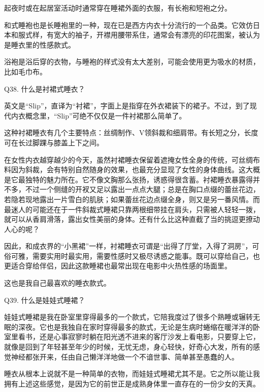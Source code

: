 \documentclass[12pt,UTF8]{ctexbook}
\begin{document}
起夜时或在起居室活动时通常穿在睡裙外面的衣服，有长袍和短袍之分。

和式睡袍也是长睡袍里的一种，现在已是西方内衣十分流行的一个品类。它效仿日本和服式样，有宽大的袖子，开襟用腰带系住，通常会有漂亮的印花图案，被认为是睡衣里的性感款式。

浴袍是浴后穿的衣物，与睡袍的样式没有太大差别，可能会使用更为吸水的材质，比如毛巾布。





Q38. 什么是衬裙式睡衣？


英文是“Slip”，直译为“衬裙”，字面上是指穿在外衣裙装下的裙子。不过，到了现代内衣概念里，“Slip”可绝不仅仅是一件衬裙那么简单了。

这种衬裙睡衣有几个主要特点：丝绸制作、V领斜裁和细肩带。有长短之分，长度可在长过脚踝与膝盖上下之间。





在女性内衣越穿越少的今天，虽然衬裙睡衣保留着遮掩女性全身的传统，可丝绸布料因为斜裁，会有特别自然随身的效果，也最充分显现了女性的身体曲线。这大概是它最独特的魅力所在。它不像文胸那么张扬，诱惑得很含蓄。衬裙睡衣暴露得并不多，不过一个侧缝的开衩又足以露出一点点大腿；总是在胸口点缀的蕾丝花边，若隐若现地露出一片雪白的肌肤；如果蕾丝花边点缀全身，则又是另一番风情。而最迷人的可能还在于一件斜裁式睡裙只靠两根细带挂在肩头，只需被人轻轻一拨，就可以从香肩滑落，露出女性美丽的身体。还有什么比这种直截了当的挑逗更撩动人心的呢？

因此，和成衣界的“小黑裙”一样，衬裙睡衣可谓是“出得了厅堂，入得了洞房”，可俗可雅，需要实用时最实用，需要性感时又极尽诱惑之能事。既可以穿给自己，也更适合穿给伴侣，因此这款睡裙也最常出现在电影中火热性感的场面里。

这也是我自己最喜欢的睡衣款式。





Q39. 什么是娃娃式睡裙？


娃娃式睡裙是我在卧室里穿得最多的一个款式，它陪我度过了很多个熟睡或辗转无眠的深夜。它也是我独自在家时穿得最多的款式，无论是生病时蜷缩在暖洋洋的卧室里看书，还是心事寂寥时躺在阳光透不进来的客厅沙发上看电影，只要穿上它，就像是回到了年轻甚至年少的时候，无忧无虑，身心轻快，好奇心大发，所有的感觉神经都张开来，任由自己懒洋洋地做一个不谙世事、简单甚至愚蠢的人。

睡衣从根本上说就不是一种简单的衣物，而娃娃式睡裙尤其不是。它之所以能让我拥有上述这些感觉，是因为它的前世正是成熟身体里一直存在的一份少女的天真。
\end{document}
